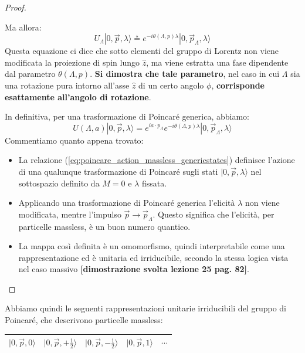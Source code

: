 \documentclass[../main.tex]{subfiles}
\begin{document}
\begin{proof}
\begin{itemize}
        Ma allora:
        \[
        \boxed{U_\Lambda|0, \Vec{p}, \lambda\rangle \overset{\star}{=} e^{-i\theta(\Lambda, p)\lambda}|0, \Vec{p}_\Lambda, \lambda\rangle}
        \]
        Questa equazione ci dice che sotto elementi del gruppo di Lorentz non viene modificata la proiezione di spin lungo $\hat{z}$, ma viene estratta una fase dipendente dal parametro \(\theta(\Lambda, p)\). \textbf{Si dimostra che tale parametro}, nel caso in cui \(\Lambda\) sia una rotazione pura intorno all'asse $\hat z$ di un certo angolo $\phi$, \textbf{corrisponde esattamente all'angolo di rotazione}.
        \end{itemize}
        In definitiva, per una trasformazione di Poincaré generica, abbiamo:
        \begin{equation}
            \boxed{U(\Lambda, a)|0, \Vec{p}, \lambda\rangle = e^{ia\cdot p_\Lambda}e^{-i\theta(\Lambda, p)\lambda}|0, \Vec{p}_\Lambda, \lambda\rangle}
            \label{eq:poincare_action_massless_genericstates}
        \end{equation}
        Commentiamo quanto appena trovato:
        \begin{itemize}
            \item[\blacksquare] La relazione (\ref{eq:poincare_action_massless_genericstates}) definisce l'azione di una qualunque trasformazione di Poincaré sugli stati $|0, \Vec{p}, \lambda\rangle$ nel sottospazio definito da $M=0$ e $\lambda$ fissata.

            \item[\blacksquare] Applicando una trasformazione di Poincaré generica l'elicità $\lambda$ non viene modificata, mentre l'impulso $\Vec{p}\rightarrow\Vec{p}_\Lambda$. Questo significa che l'elicità, per particelle massless, è un buon numero quantico.  

            \item[\blacksquare] La mappa così definita è un omomorfismo, quindi interpretabile come una rappresentazione ed è unitaria ed irriducibile, secondo la stessa logica vista nel caso massivo \textbf{[dimostrazione svolta lezione 25 pag. 82]}.
        \end{itemize}
\end{proof}

Abbiamo quindi le seguenti rappresentazioni unitarie irriducibili del gruppo di Poincaré, che descrivono particelle massless:
\begin{center}
    \begin{tabular}{|l|l|l|l|l|}
    \hline
    $|0, \Vec{p}, 0\rangle$                & $|0, \Vec{p}, + \frac{1}{2}\rangle$  & $|0, \Vec{p}, - \frac{1}{2}\rangle$  &$|0, \Vec{p}, 1\rangle$ & $\cdots$ \\
    \hline
    \end{tabular}
\end{center}
\end{document}
